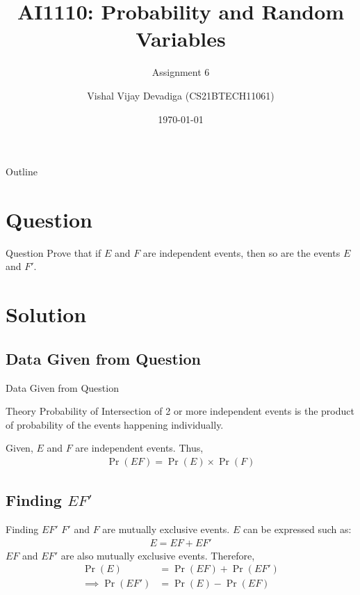 \documentclass{beamer}
\title{AI1110: Probability and Random Variables}
\subtitle{Assignment 6}
\author{Vishal Vijay Devadiga (CS21BTECH11061)}
\date{\today}
\providecommand{\pr}[1]{\ensuremath{\Pr\left(#1\right)}}
\begin{document}
\begin{frame}
    \titlepage
\end{frame}

\logo{}

\begin{frame}{Outline}
    \tableofcontents
\end{frame}

\section{Question}
\begin{frame}{Question}
    Prove that if $E$ and $F$ are independent events, then so are the events $E$ and $F'$.
\end{frame}

\section{Solution}
\subsection{Data Given from Question}
\begin{frame}{Data Given from Question}
    \begin{block}{Theory}
        Probability of Intersection of 2 or more independent events is the product of probability of the events happening individually.
    \end{block}
    Given, $E$ and $F$ are independent events. Thus,
    \begin{align}
        \label{eq:1}
        \pr{E F} = \pr{E} \times \pr{F}
    \end{align}
\end{frame}

\subsection{Finding $EF'$}
\begin{frame}{Finding $EF'$}
    $F'$ and $F$ are mutually exclusive events. $E$ can be expressed such as:
    \begin{align}
        E = EF + EF'
    \end{align}
    $EF$ and $EF'$ are also mutually exclusive events. Therefore,
    \begin{align}
        \pr{E}            & = \pr{EF} + \pr{EF'}
        \\
        \label{eq:2}
        \implies \pr{EF'} & = \pr{E} - \pr{EF}
    \end{align}
\end{frame}
\end{document}
